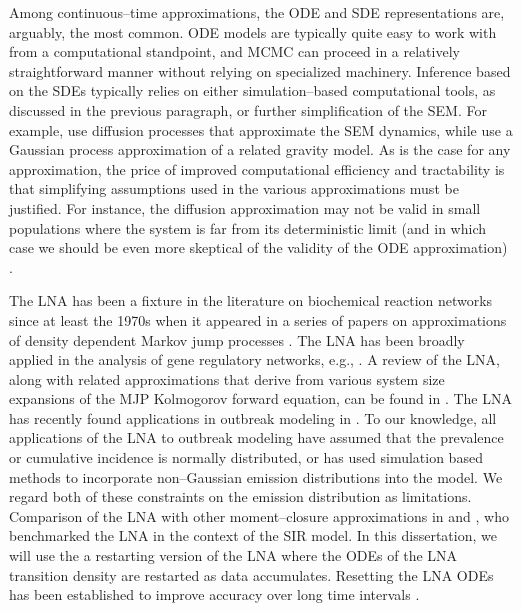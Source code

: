 Among continuous--time approximations, the ODE and SDE representations are, arguably, the most common. ODE models are typically quite easy to work with from a computational standpoint, and MCMC can proceed in a relatively straightforward manner without relying on specialized machinery. Inference based on the SDEs typically relies on either simulation--based computational tools, as discussed in the previous paragraph, or further simplification of the SEM. For example, \cite{cauchemez2004bayesian,cauchemez2008,roberts2001} use diffusion processes that approximate the SEM dynamics, while \cite{jandarov2014} use a Gaussian process approximation of a related gravity model. As is the case for any approximation, the price of improved computational efficiency and tractability is that simplifying assumptions used in the various approximations must be justified. For instance, the diffusion approximation may not be valid in small populations where the system is far from its deterministic limit (and in which case we should be even more skeptical of the validity of the ODE approximation) \cite{andersson2000stochastic}.

The LNA has been a fixture in the literature on biochemical reaction networks since at least the 1970s when it appeared in a series of papers on approximations of density dependent Markov jump processes \cite{kurtz1970solutions,kurtz1971limit}. The LNA has been broadly applied in the analysis of gene regulatory networks, e.g., \cite{finkenstadt2013quantifying,giagos2010inference,hey2015stochastic,komorowski2009,stathopoulos2013markov,thomas2012slow,zimmer2015deterministic}. A review of the LNA, along with related approximations that derive from various system size expansions of the MJP Kolmogorov forward equation, can be found in \cite{schnoerr2017approximation,wallace2012linear}. The LNA has recently found applications in outbreak modeling in \cite{black2010stochastic,fearnhead2014,golightly2015delayed,golightly2018bridge,ross2009parameter,ross2012parameter,rebuli2017hybrid,zimmer2017likelihood}. To our knowledge, all applications of the LNA to outbreak modeling have assumed that the prevalence or cumulative incidence is normally distributed, or has used simulation based methods to incorporate non--Gaussian emission distributions into the model. We regard both of these constraints on the emission distribution as limitations. Comparison of the LNA with other moment--closure approximations in \cite{grima2012study} and \cite{buckingham2018gaussian}, who benchmarked the LNA in the context of the SIR model. 
In this dissertation, we will use the a restarting version of the LNA where the ODEs of the LNA transition density are restarted as data accumulates. Resetting the LNA ODEs has been established to improve accuracy over long time intervals \cite{fearnhead2014,folia2017trajectory,giagos2010inference}.

